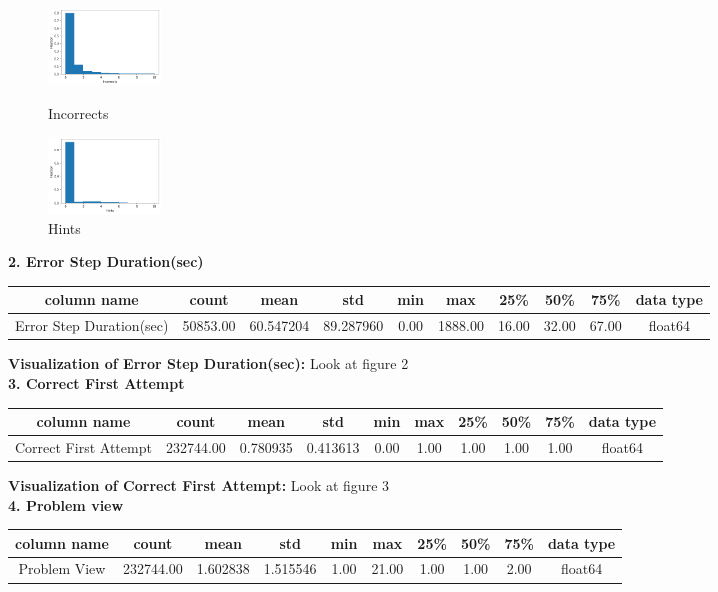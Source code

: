 \documentclass{article}
\begin{document}
\begin{figure}[htbp]
\begin{minipage}[c]{3cm}
    \centering
    \includegraphics[width=3cm]{incorrects.png}
    \caption{Incorrects}
  \end{minipage}
  \begin{minipage}[c]{3cm}
    \centering
    \includegraphics[width=3cm]{hints.png}
    \caption{Hints}
  \end{minipage}
\end{figure}

\textbf{2. Error Step Duration(sec)}\\
\begin{tabular}{|c|c|c|c|c|c|c|c|c|c|}
  \hline
  column name              & count    & mean      & std       & min  & max     & 25\%  & 50\%  & 75\%  & data type \\
  \hline
  Error Step Duration(sec) & 50853.00 & 60.547204 & 89.287960 & 0.00 & 1888.00 & 16.00 & 32.00 & 67.00 & float64   \\
  \hline
\end{tabular}

\textbf{Visualization of Error Step Duration(sec):} Look at figure 2\\
\textbf{3. Correct First Attempt}\\
\begin{tabular}{|c|c|c|c|c|c|c|c|c|c|}
  \hline
  column name           & count     & mean     & std      & min  & max  & 25\% & 50\% & 75\% & data type \\
  \hline
  Correct First Attempt & 232744.00 & 0.780935 & 0.413613 & 0.00 & 1.00 & 1.00 & 1.00 & 1.00 & float64   \\
  \hline
\end{tabular}

\textbf{Visualization of Correct First Attempt:} Look at figure 3\\
\textbf{4. Problem view}\\
\begin{tabular}{|c|c|c|c|c|c|c|c|c|c|}
  \hline
  column name  & count     & mean     & std      & min  & max   & 25\% & 50\% & 75\% & data type \\
  \hline
  Problem View & 232744.00 & 1.602838 & 1.515546 & 1.00 & 21.00 & 1.00 & 1.00 & 2.00 & float64   \\
  \hline
\end{tabular}
\end{document}
